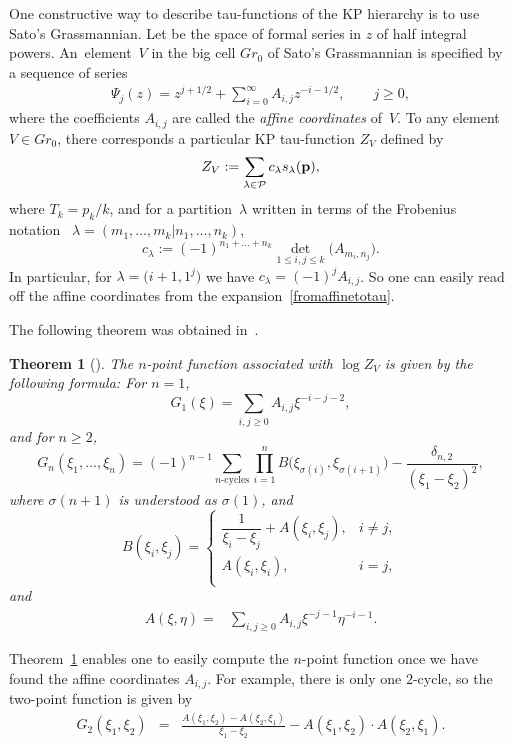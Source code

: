 \documentclass[pdftex]{sigma}
\newcommand{\be}{\begin{equation}}
\newcommand{\beq}{\begin{equation}}
\newcommand{\ee}{\end{equation}}
\newcommand{\eeq}{\end{equation}}
\newcommand{\ben}{\begin{eqnarray*}}
\newcommand{\een}{\end{eqnarray*}}
\numberwithin{equation}{section}
\newtheorem{Theorem}{Theorem}[section]
\begin{document}
One constructive way to describe tau-functions of the KP hierarchy is
to use Sato's Grassmannian. Let
 be the space of formal series in $z$ of half integral powers.
An~element~$V$ in the big cell $Gr_0$ of Sato's Grassmannian is specified by a sequence of series
\begin{gather*} %
\Psi_j(z) = z^{j+1/2} + \sum_{i=0}^\infty A_{i,j} z^{-i-1/2}, \qquad j \geq 0,
\end{gather*}
where the coefficients $A_{i,j}$ are called the {\em affine coordinates} of~$V$. To any element~$V\in Gr_0$, there corresponds
a particular KP tau-function $Z_V$ defined by
\beq\label{fromaffinetotau}
Z_V:= \sum_{\lambda\in\mathcal{P}} c_\lambda s_\lambda({\bf p}),
\eeq
where $T_k=p_k/k$, and for a partition~$\lambda$ written in terms of the Frobenius notation~\cite[Section~I.1, p.~3]{Mac}
$\lambda=(m_1,\dots,m_k|n_1,\dots,n_k)$,
\[
c_\lambda := (-1)^{n_1+\dots+n_k} \det_{1\leq i,j\leq k} \bigl(A_{m_i, n_j}\bigr).
\]
In particular, for $\lambda=\bigl(i+1,1^j\bigr)$ we have $c_\lambda=(-1)^j A_{i,j}$.
So one can easily read off the affine coordinates from the expansion~\eqref{fromaffinetotau}.

The following theorem was obtained in~\cite{Zhou-Emergent}.

\begin{Theorem}[\cite{Zhou-Emergent}]\label{thm:n-point-KP}
The $n$-point function associated with $\log Z_V$ is given by the following formula:
For $n=1$,
\be \label{eqn:G-1}
G_1(\xi) = \sum_{i,j\geq 0} A_{i,j} \xi^{-i-j-2},
\ee
and for $n \ge2 $,
\be \label{eqn:G-n}
G_n(\xi_1, \ldots, \xi_n)
= (-1)^{n-1} \sum_{\text{$n$-cycles}}
\prod_{i=1}^n B\bigl(\xi_{\sigma(i)}, \xi_{\sigma(i+1)}\bigr)
- \frac{\delta_{n,2}}{(\xi_1-\xi_2)^2},
\ee
where $\sigma(n+1)$ is understood as $\sigma(1)$, and
\[
B(\xi_i, \xi_j) = \begin{cases}
\dfrac{1}{\xi_i-\xi_j} + A(\xi_i, \xi_j), & i \neq j, \\
A(\xi_i, \xi_i), & i =j, \\
\end{cases}
\]
and
\[
\begin{split}
A(\xi, \eta)
= & \sum_{i,j \geq 0} A_{i,j} \xi^{-j-1} \eta^{-i-1} .
\end{split}
\]
\end{Theorem}

Theorem~\ref{thm:n-point-KP} enables one to easily compute the $n$-point function once
we have found the affine coordinates $A_{i,j}$.
For example, there is only one $2$-cycle,
so the two-point function is given by
\ben
G_2(\xi_1, \xi_2)
& = & \frac{A(\xi_1, \xi_2) - A(\xi_2,\xi_1)}{\xi_1-\xi_2}
-A(\xi_1, \xi_2)\cdot A(\xi_2,\xi_1).
\een
\end{document}
